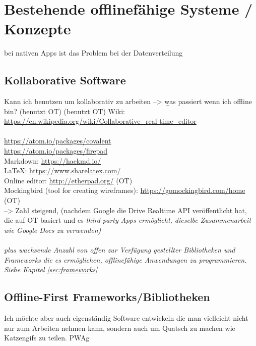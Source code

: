 \chapter{\label{chap:state}Bestehende offlinefähige Systeme / Konzepte}

bei nativen Apps ist das Problem bei der Datenverteilung
%
%
\section{Kollaborative Software}
Kann ich benutzen um kollaborativ zu arbeiten --> \b{was passiert wenn ich offline bin?}
(benutzt OT)
(benutzt OT)
Wiki: \url{https://en.wikipedia.org/wiki/Collaborative_real-time_editor}\\\\
\url{https://atom.io/packages/covalent}\\
\url{https://atom.io/packages/firepad}\\
Markdown: \url{https://hackmd.io/}\\
LaTeX: \url{https://www.sharelatex.com/}\\
Online editor: \url{http://etherpad.org/} (OT)\\
Mockingbird (tool for creating wireframes): \url{https://gomockingbird.com/home} (OT)\\
--> Zahl steigend, (nachdem Google die Drive Realtime API veröffentlicht hat, die auf \gls{OT} basiert und es \it{third-party Apps} ermöglicht, dieselbe Zusammenarbeit wie Google Docs zu verwenden)\\\\
\b{plus} wachsende Anzahl von offen zur Verfügung gestellter Bibliotheken und Frameworks die es ermöglichen, offlinefähige Anwendungen zu programmieren. Siehe Kapitel \ref{sec:frameworks}
%
%
\section{\label{sec:frameworks}Offline-First Frameworks/Bibliotheken}
Ich möchte aber auch eigenständig Software entwickeln die man vielleicht nicht nur zum Arbeiten nehmen kann, sondern auch um Quatsch zu machen wie Katzengifs zu teilen.
\Gls{PWAg}
%
%

%
%


%
%


%
%


%
%

